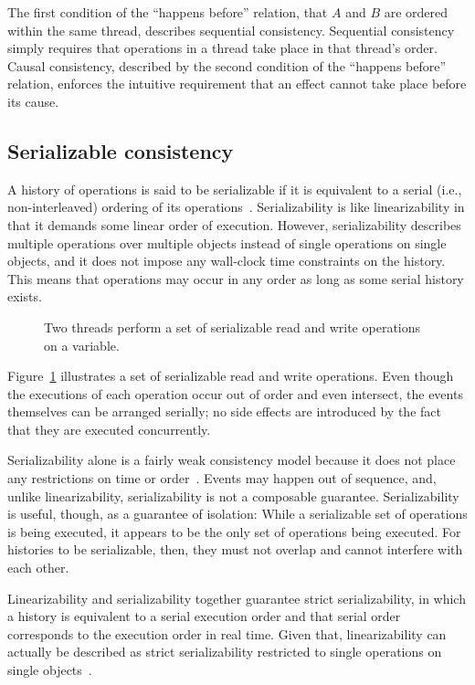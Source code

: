 \documentclass{sig-alternate}
\begin{document}
The first condition of the ``happens before'' relation, that $A$ and $B$ are ordered within the same thread, describes sequential consistency. Sequential consistency simply requires that operations in a thread take place in that thread's order. Causal consistency, described by the second condition of the ``happens before'' relation, enforces the intuitive requirement that an effect cannot take place before its cause.

\subsection{Serializable consistency}

A history of operations is said to be serializable if it is equivalent to a serial (i.e., non-interleaved) ordering of its operations~\cite{Herlihy1990}. Serializability is like linearizability in that it demands some linear order of execution. However, serializability describes multiple operations over multiple objects instead of single operations on single objects, and it does not impose any wall-clock time constraints on the history. This means that operations may occur in any order as long as some serial history exists.

\begin{figure}[ht]
  \centering
  \resizebox{0.76\linewidth}{!}{}
  \caption{Two threads perform a set of serializable read and write operations on a variable.}
\label{figure:serializability}
\end{figure}

Figure~\ref{figure:serializability} illustrates a set of serializable read and write operations. Even though the executions of each operation occur out of order and even intersect, the events themselves can be arranged serially; no side effects are introduced by the fact that they are executed concurrently.

Serializability alone is a fairly weak consistency model because it does not place any restrictions on time or order~\cite{Kingsbury2014}. Events may happen out of sequence, and, unlike linearizability, serializability is not a composable guarantee. Serializability is useful, though, as a guarantee of isolation: While a serializable set of operations is being executed, it appears to be the only set of operations being executed. For histories to be serializable, then, they must not overlap and cannot interfere with each other.

Linearizability and serializability together guarantee strict serializability, in which a history is equivalent to a serial execution order and that serial order corresponds to the execution order in real time. Given that, linearizability can actually be described as strict serializability restricted to single operations on single objects~\cite{Herlihy1990}.
\end{document}
